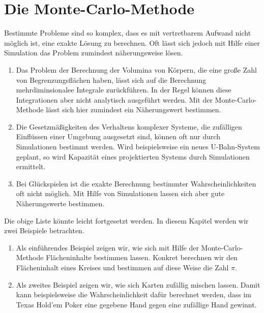 \chapter{Die Monte-Carlo-Methode}
Bestimmte Probleme sind so komplex, dass es mit vertretbarem Aufwand nicht m\"oglich ist, eine exakte L\"osung zu
berechnen.  Oft l\"asst sich jedoch mit Hilfe einer Simulation das Problem zumindest n\"aherungsweise l\"osen.  
\begin{enumerate}
\item Das Problem der Berechnung der Volumina von K\"orpern, die eine gro{\ss}e Zahl von Begrenzungsfl\"achen haben,
      l\"asst sich auf die Berechnung mehrdiminsionalee Integrale zur\"uckf\"uhren.  In der Regel k\"onnen diese
      Integrationen aber nicht analytisch ausgef\"uhrt werden.   Mit der Monte-Carlo-Methode l\"asst sich hier
      zumindest ein N\"aherungswert bestimmen.
\item Die Gesetzm\"a{\ss}igkeiten des Verhaltens komplexer Systeme, die zuf\"alligen Einfl\"ussen einer Umgebung
      ausgesetzt sind, k\"onnen oft nur durch Simulationen bestimmt werden.  Wird beispielsweise ein neues
      U-Bahn-System geplant, so wird Kapazit\"at eines projektierten Systems durch Simulationen ermittelt.
\item Bei Gl\"uckspielen ist die exakte Berechnung bestimmter Wahrscheinlichkeiten oft nicht m\"oglich.
      Mit Hilfe von Simulationen lassen sich aber gute N\"aherungswerte bestimmen.  
\end{enumerate}
Die obige Liste k\"onnte leicht fortgesetzt werden.  In diesem Kapitel werden wir zwei Beispiele betrachten.
\begin{enumerate}
\item Als einf\"uhrendes Beispiel zeigen wir, wie sich mit Hilfe der Monte-Carlo-Methode Fl\"acheninhalte bestimmen
      lassen.  Konkret berechnen wir den Fl\"acheninhalt eines Kreises und bestimmen auf diese Weise
      die Zahl $\pi$.
\item Als zweites Beispiel zeigen wir, wie sich Karten zuf\"allig mischen lassen.
      Damit kann beispielsweise die Wahrscheinlichkeit daf\"ur berechnet werden, dass im Texas Hold'em Poker eine
      gegebene Hand gegen eine zuf\"allige Hand gewinnt.
\end{enumerate}

